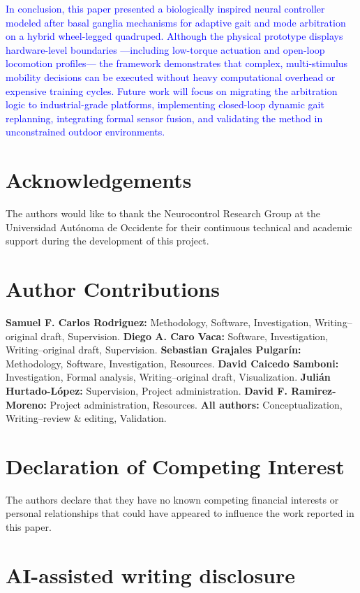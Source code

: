 \documentclass[preprint,12pt]{elsarticle}
\newcommand{\revblue}[1]{\textcolor{blue}{#1}}
\begin{document}
\revblue{In conclusion, this paper presented a biologically inspired neural controller modeled after basal ganglia mechanisms for adaptive gait and mode arbitration on a hybrid wheel-legged quadruped. Although the physical prototype displays hardware-level boundaries ---including low-torque actuation and open-loop locomotion profiles--- the framework demonstrates that complex, multi-stimulus mobility decisions can be executed without heavy computational overhead or expensive training cycles. Future work will focus on migrating the arbitration logic to industrial-grade platforms, implementing closed-loop dynamic gait replanning, integrating formal sensor fusion, and validating the method in unconstrained outdoor environments.}

\section*{Acknowledgements}

The authors would like to thank the Neurocontrol Research Group at the Universidad Autónoma de Occidente for their continuous technical and academic support during the development of this project.

\section*{Author Contributions}

\textbf{Samuel F. Carlos Rodriguez:} Methodology, Software, Investigation, Writing--original draft, Supervision.
\textbf{Diego A. Caro Vaca:} Software, Investigation, Writing--original draft, Supervision.
\textbf{Sebastian Grajales Pulgarín:} Methodology, Software, Investigation, Resources.
\textbf{David Caicedo Samboni:} Investigation, Formal analysis, Writing--original draft, Visualization.
\textbf{Julián Hurtado-López:} Supervision, Project administration.
\textbf{David F. Ramirez-Moreno:} Project administration, Resources.
\textbf{All authors:} Conceptualization, Writing--review \& editing, Validation.

\section*{Declaration of Competing Interest}

The authors declare that they have no known competing financial interests or personal relationships that could have appeared to influence the work reported in this paper.

\section*{AI-assisted writing disclosure}
\end{document}
